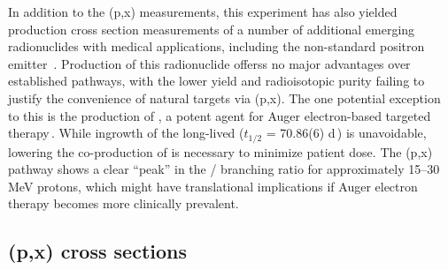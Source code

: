In addition to the (p,x) measurements, this experiment has also yielded production cross section  measurements of  a number of additional  emerging radionuclides with medical applications,
including the non-standard positron emitter 
\,\cite{Thisgaard2011,Zaman1996,Hermanne2000a}.
Production of this radionuclide offerss no major advantages over established pathways, with the  lower yield and radioisotopic purity failing to justify the convenience of natural targets  via   (p,x).
The one potential exception to this is the production of , a potent agent for Auger electron-based targeted therapy\,\cite{Thisgaard2011a,Valdovinos2017b,Thisgaard2014a}.
While ingrowth of the long-lived  ($t_{1/2}$ = 70.86(6) d\,\cite{Nesaraja2010}) is unavoidable, lowering the  co-production of  is necessary to minimize patient dose.
The (p,x) pathway shows a clear \enquote{peak} in the / branching ratio for approximately 15--30\,MeV protons, which might have translational implications if Auger electron therapy becomes more clinically prevalent. 




\subsection{(p,x) cross sections}


